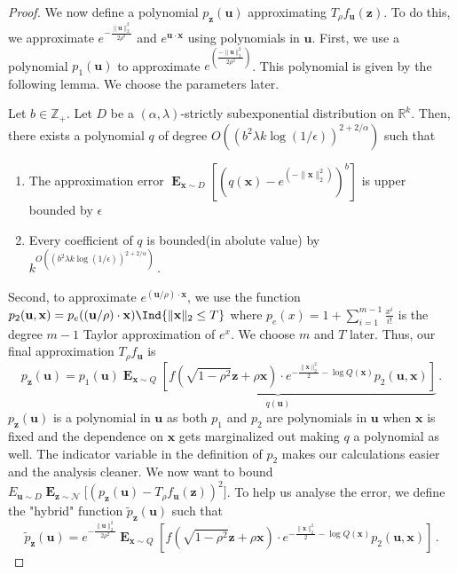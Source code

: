 \documentclass{theoretics}
\newcommand\twonorm[1]{\|#1\|_2}
\renewcommand\vec[1]{\mathbf{#1}}
\DeclareMathOperator*{\E}{\mathbf{E}}
\newcommand{\R}{\mathbb{R}}
\newcommand{\Z}{\mathbb{Z}}
\newcommand{\1}{\Ind}
\newcommand{\x}{\vec x}
\newcommand{\vu}{\vec u}
\newcommand{\z}{\vec z}
\newcommand{\Gauss}{\mathcal{N}}
\begin{document}
\begin{proof}
    We now define a polynomial $p_{\z}(\vu)$ approximating $T_{\rho}f_{\vu}(\z)$. To do this, we approximate $e^{-\frac{\twonorm{\vu}^2}{2\rho^2}}$ and $e^{\vu\cdot \x}$ using polynomials in $\vu$. 
    First, we use a polynomial $p_1(\vu)$ to approximate $e^{\left(\frac{-\twonorm{\vu}^2}{2\rho^2}\right)}$. This polynomial is given by the following lemma. We choose the parameters later.
\begin{lemma}
    \label{thm:exp_approx_subexp}
    Let $b\in \Z_{+}$. Let $D$ be a $(\alpha,\lambda)$-strictly subexponential distribution on $\R^k$. Then, there exists a polynomial $q$ of degree $O\left( (b^2\lambda k\log(1/\epsilon))^{2+2/\alpha} \right)$ such that 
    \begin{enumerate}
        \item The approximation error $\E_{\x\sim D}\left[ \left(q(\x)-e^{\left(-\twonorm{\x}^2\right)}\right)^b\right]$ is upper bounded by  $\epsilon$
    \item Every coefficient of $q$ is bounded(in abolute value) by $k^{O\left((b^{2}\lambda k\log(1/\epsilon))^{2+2/\alpha} \right)}\,.$ 
    \end{enumerate}
\end{lemma}
 Second, to approximate $e^{(\vu/\rho)\cdot\x}$, we use the function $p_2(\vu,\x)=p_e((\vu/\rho)\cdot \x)\1\{\twonorm{\x}\leq T\}$ where $p_e(x)=1+\sum_{i=1}^{m-1}\frac{x^i}{i!}$ is the degree $m-1$ Taylor approximation of $e^x$. We choose $m$ and $T$ later. 
    Thus, our final approximation $T_{\rho}f_{\vu}$ is 
    \[
        p_{\z}(\vu)=p_1(\vu)\underbrace{\E_{\x\sim Q}\left[f(\sqrt{1-\rho^2}\z+\rho\x)\cdot e^{-\frac{\twonorm{\x}^2}{2}-\log Q(\x)}p_2(\vu,\x)\right]}_{\text{$q(\vu)$}}\,.
    \]
    $p_{\z}(\vu)$ is a polynomial in $\vu$ as both $p_1$ and $p_2$ are polynomials in $\vu$ when $\x$ is fixed and the dependence on $\x$ gets marginalized out making $q$ a polynomial as well. The indicator variable in the definition of $p_2$ makes our calculations easier and the analysis cleaner. We now want to bound $E_{\vu\sim D}\E_{\z\sim \Gauss}\bigl[(p_{\z}(\vu)-T_{\rho}f_{\vu}(\z))^2\bigr]$. To help us analyse the error, we define the "hybrid" function $\tilde{p}_{\z}(\vu)$ such that 
    \[
        \tilde{p}_{\z}(\vu)=e^{-\frac{\twonorm{\vu}^2}{2\rho^2}}\E_{\x\sim Q}\left[f(\sqrt{1-\rho^2}\z+\rho\x)\cdot e^{-\frac{\twonorm{\x}^2}{2}-\log Q(\x)}p_2(\vu,\x)\right]\,.
    \]


\end{proof}
\end{document}
